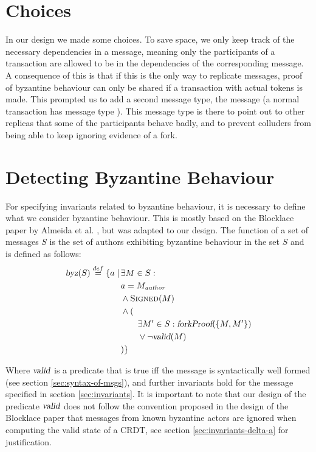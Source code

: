 \section{Choices}
\label{sec:choices}
In our design we made some choices. To save space, we only keep track of the necessary dependencies in a message, meaning only the participants of a transaction are allowed to be in the dependencies of the corresponding message. A consequence of this is that if this is the only way to replicate messages, proof of byzantine behaviour can only be shared if a transaction with actual tokens is made. This prompted us to add a second message type, the  message (a normal transaction has message type ).
This message type is there to point out to other replicas that some of the participants behave badly, and to prevent colluders from being able to keep ignoring evidence of a fork.

\section{Detecting Byzantine Behaviour}
For specifying invariants related to byzantine behaviour, it is necessary to define what we consider byzantine behaviour. This is mostly based on the Blocklace paper by Almeida et al. \cite{blocklace-crdt}, but was adapted to our design.
The function  of a set of messages $S$ is the set of authors exhibiting byzantine behaviour in the set $S$ and is defined as follows:
\begin{align*}
    \textsl{byz}(S) \stackrel{def}{=} \{a \mid\,&\exists M \in S : \\
    &a = M_\emph{author}\\
    &\land \textsc{Signed}(M)\\
    &\land (\\
    &\qquad \exists M' \in S : \textsl{forkProof}(\{M, M'\}) \\
    &\qquad \lor \lnot \textsl{valid}(M) \\
    &)\}
\end{align*}

Where $\textsl{valid}$ is a predicate that is true iff the message is syntactically well formed (see section \ref{sec:syntax-of-msgs}), and further invariants hold for the message specified in section \ref{sec:invariants}. It is important to note that our design of the predicate $\textsl{valid}$ does not follow the convention proposed in the design of the Blocklace paper that messages from known byzantine actors are ignored when computing the valid state of a CRDT, see section \ref{sec:invariants-delta-a} for justification.

